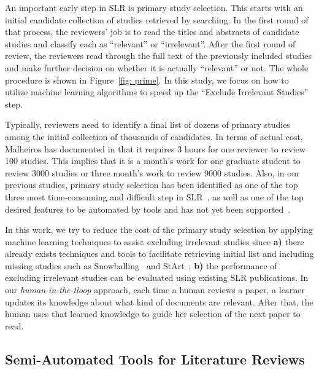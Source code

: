 \documentclass[final,twocolumn,5p]{elsarticle}
\theoremstyle{break}
\begin{document}
An important early step in SLR is primary study selection. This starts with an initial candidate collection of studies retrieved by searching. In the first round of that process,
the reviewers' job is to read the titles and abstracts of candidate studies and classify each as ``relevant'' or ``irrelevant''. After the first round of review, the reviewers read through the full text of the previously included studies and make further decision on whether it is actually ``relevant'' or not. The whole procedure is shown in Figure~\ref{fig: prime}. In this study, we focus on how to utilize machine learning algorithms to speed up the ``Exclude Irrelevant Studies'' step.

Typically, reviewers need to identify a final list of dozens of primary studies
among the initial collection of thousands of candidates. In terms of actual
cost, Malheiros has documented in \cite{malheiros2007visual} that it requires 3
hours for one reviewer to review 100 studies.  This implies that it is a month's
work for one graduate student to review 3000 studies or three month's work to
review 9000 studies. Also, in our previous studies, primary
study selection has been identified as one of the top three most time-consuming
and difficult step in SLR~\cite{carver2013identifying}, as well as one of the
top desired features to be automated by tools and has not yet been
supported~\cite{hassler2014outcomes,hassler2016identification,marshall2015tools,marshall2014tools}.


In this work, we try to reduce the cost of the primary study selection by applying machine learning techniques to assist excluding irrelevant studies since \textbf{a)} there already exists techniques and tools to facilitate retrieving initial list and including missing studies such as Snowballing~\cite{jalali2012systematic} and StArt~\cite{hernandes2012using}; \textbf{b)} the performance of excluding irrelevant studies can be evaluated using existing SLR publications. In our {\em human-in-the-tloop} approach, each time a human reviews a paper, a learner updates its knowledge about what kind of documents are relevant. After that, the human uses that learned knowledge to guide her selection of the next paper to read.



\subsection{Semi-Automated Tools for Literature  Reviews}
\end{document}
